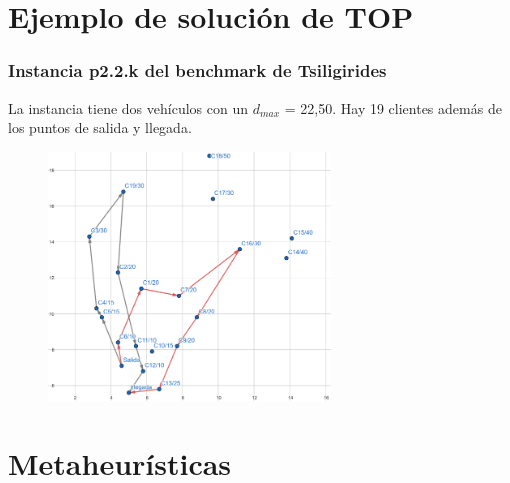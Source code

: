 \documentclass{beamer}
\begin{document}

\section{Ejemplo de solución de TOP}

\begin{frame}
\frametitle{Instancia p2.2.k del benchmark de Tsiligirides}

La instancia tiene dos vehículos con un $d_{max}$ = 22,50. Hay 19 clientes además de los puntos de salida y llegada.%

\begin{figure}[h]
	\centering
	\includegraphics[width=7.5cm]{400cropped}
	\label{fig:400cropped}
\end{figure}


\end{frame}


\section{Metaheurísticas}
\end{document}
